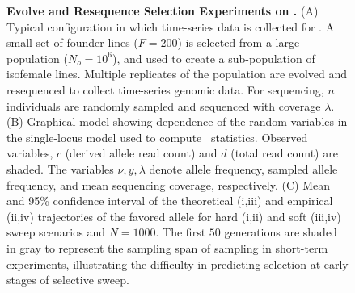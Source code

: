 \documentclass[9pt,twocolumn,twoside]{gsajnl}
\begin{document}
\begin{figure}
\begin{tabular}{l|l}
	\end{tabular}
	\hspace{-1in}
	\caption{{\bf Evolve and Resequence Selection Experiments on \dmel.}
		(A) Typical configuration in which time-series data is 
		collected for
		\dmel. A small set of founder lines ($F=200$) is selected from a
		large population ($N_o=10^{6}$), and used to create a 
		sub-population
		of isofemale lines. Multiple replicates of the population are
		evolved and resequenced to collect time-series genomic data. For
		sequencing, $n$ individuals are randomly sampled and sequenced 
		with
		coverage $\lambda$.  (B) Graphical model showing dependence of 
		the
		random variables in the single-locus model used to compute 
		\comale\
		statistics. Observed variables, $c$ (derived allele read count) 
		and
		$d$ (total read count) are shaded. The variables $\nu,y,\lambda$
		denote allele frequency, sampled allele frequency, and mean
		sequencing coverage, respectively. (C) Mean and 95\% confidence
		interval of the theoretical (i,iii) and empirical (ii,iv)
		trajectories of the favored allele for hard (i,ii) and soft 
		(iii,iv)
		sweep scenarios and $N=1000$.  The first $50$ generations are 
		shaded
		in gray to represent the sampling span of sampling in short-term
		experiments, illustrating the difficulty in predicting 
		selection at
		early stages of selective sweep.  }
	\label{fig:1}
\end{figure}
\end{document}
